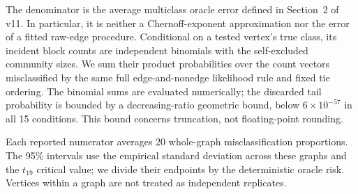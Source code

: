The denominator is the average multiclass oracle error defined in Section~2 of v11. In particular, it is neither a Chernoff-exponent approximation nor the error of a fitted raw-edge procedure. Conditional on a tested vertex's true class, its incident block counts are independent binomials with the self-excluded community sizes. We sum their product probabilities over the count vectors misclassified by the same full edge-and-nonedge likelihood rule and fixed tie ordering. The binomial sums are evaluated numerically; the discarded tail probability is bounded by a decreasing-ratio geometric bound, below $6\times10^{-57}$ in all 15 conditions. This bound concerns truncation, not floating-point rounding.

Each reported numerator averages 20 whole-graph misclassification proportions. The 95\% intervals use the empirical standard deviation across these graphs and the $t_{19}$ critical value; we divide their endpoints by the deterministic oracle risk. Vertices within a graph are not treated as independent replicates.

